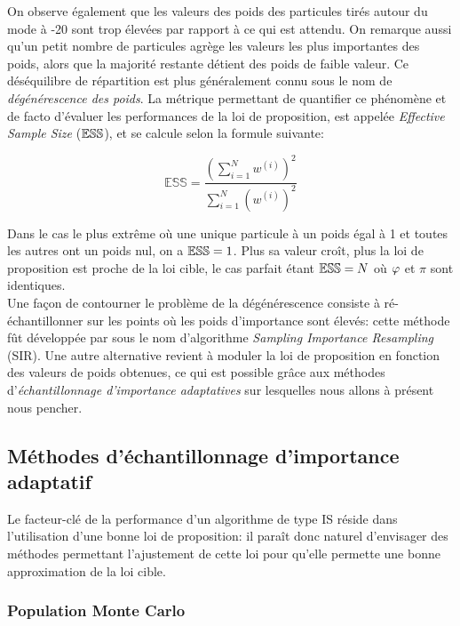 On observe également que les valeurs des poids des particules tirés autour du mode à -20 sont trop élevées par rapport à ce qui est attendu. On remarque aussi qu'un petit nombre de particules agrège les valeurs les plus importantes des poids, alors que la majorité restante détient des poids de faible valeur. Ce déséquilibre de répartition est plus généralement connu sous le nom de \textit{dégénérescence des poids}. La métrique permettant de quantifier ce phénomène et de facto d'évaluer les performances de la loi de proposition, est appelée \textit{Effective Sample Size} (${\mathbb{ESS}}$), et se calcule selon la formule suivante:

\begin{equation}
\mathbb{ESS} = \dfrac{\left(\sum\limits_{i=1}^N w^{(i)}\right)^2}{\sum\limits_{i=1}^N \left(w^{(i)}\right)^2}
\label{eq_def_ESS}
\end{equation}

Dans le cas le plus extrême où une unique particule à un poids égal à 1 et toutes les autres ont un poids nul, on a ${\mathbb{ESS}} = 1$. Plus sa valeur croît, plus la loi de proposition est proche de la loi cible, le cas parfait étant ${\mathbb{ESS}} = N$ où ${\varphi}$ et $\pi$ sont identiques.\\

Une façon de contourner le problème de la dégénérescence consiste à ré-échantillonner sur les points où les poids d'importance sont élevés: cette méthode fût développée par \cite{Rubin1988} sous le nom d'algorithme \textit{Sampling Importance Resampling} (SIR). Une autre alternative  revient à moduler la loi de proposition en fonction des valeurs de poids obtenues, ce qui est possible grâce aux méthodes d'\textit{échantillonnage d'importance adaptatives} sur lesquelles nous allons à présent nous pencher.\\

\subsection{Méthodes d'échantillonnage d'importance adaptatif}

Le facteur-clé de la performance d'un algorithme de type IS réside dans l'utilisation d'une bonne loi de proposition: il paraît donc naturel d'envisager des méthodes permettant l'ajustement de cette loi pour qu'elle permette une bonne approximation de la loi cible. \\

\subsubsection{Population Monte Carlo}

